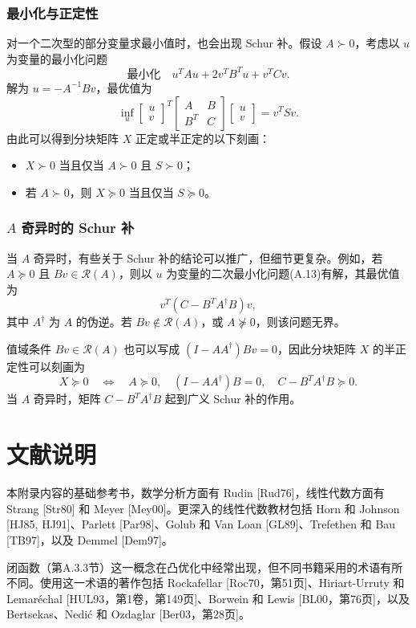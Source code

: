 \subsubsection*{最小化与正定性}
对一个二次型的部分变量求最小值时，也会出现 Schur 补。假设 $A\succ0$，考虑以 $u$ 为变量的最小化问题
\begin{equation}
 \text{最小化}\quad u^TAu+2v^TB^Tu+v^TCv.\tag{A.13}
\end{equation}
解为 $u=-A^{-1}Bv$，最优值为
\begin{equation}
 \inf_u\begin{bmatrix}u\\v\end{bmatrix}^{\!T}
 \begin{bmatrix}A&B\\B^T&C\end{bmatrix}\begin{bmatrix}u\\v\end{bmatrix}=v^TSv.\tag{A.14}
\end{equation}
由此可以得到分块矩阵 $X$ 正定或半正定的以下刻画：
\begin{itemize}
\item $X\succ0$ 当且仅当 $A\succ0$ 且 $S\succ0$；
\item 若 $A\succ0$，则 $X\succeq0$ 当且仅当 $S\succeq0$。
\end{itemize}

\subsubsection*{$A$ 奇异时的 Schur 补}
当 $A$ 奇异时，有些关于 Schur 补的结论可以推广，但细节更复杂。例如，若 $A\succeq0$ 且 $Bv\in\mathcal R(A)$，则以 $u$ 为变量的二次最小化问题(A.13)有解，其最优值为
\[
 v^T(C-B^TA^\dagger B)v,
\]
其中 $A^\dagger$ 为 $A$ 的伪逆。若 $Bv\notin\mathcal R(A)$，或 $A\not\succeq0$，则该问题无界。

值域条件 $Bv\in\mathcal R(A)$ 也可以写成 $(I-AA^\dagger)Bv=0$，因此分块矩阵 $X$ 的半正定性可以刻画为
\[
 X\succeq0\quad\Longleftrightarrow\quad A\succeq0,\quad(I-AA^\dagger)B=0,\quad C-B^TA^\dagger B\succeq0.
\]
当 $A$ 奇异时，矩阵 $C-B^TA^\dagger B$ 起到广义 Schur 补的作用。

\section*{文献说明}
本附录内容的基础参考书，数学分析方面有 Rudin [Rud76]，线性代数方面有 Strang [Str80] 和 Meyer [Mey00]。更深入的线性代数教材包括 Horn 和 Johnson [HJ85, HJ91]、Parlett [Par98]、Golub 和 Van Loan [GL89]、Trefethen 和 Bau [TB97]，以及 Demmel [Dem97]。

闭函数（第A.3.3节）这一概念在凸优化中经常出现，但不同书籍采用的术语有所不同。使用这一术语的著作包括 Rockafellar [Roc70，第51页]、Hiriart-Urruty 和 Lemaréchal [HUL93，第1卷，第149页]、Borwein 和 Lewis [BL00，第76页]，以及 Bertsekas、Nedić 和 Ozdaglar [Ber03，第28页]。

